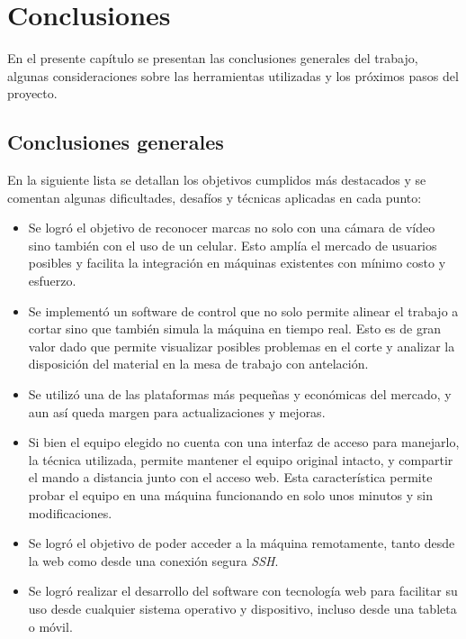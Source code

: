 \chapter{Conclusiones}
\label{Chapter5}
En el presente capítulo se presentan las conclusiones generales del trabajo, algunas consideraciones sobre las herramientas utilizadas y los próximos pasos del proyecto.

\section{Conclusiones generales }

En la siguiente lista se detallan los objetivos cumplidos más destacados y se comentan algunas dificultades, desafíos y técnicas aplicadas en cada punto:

\begin{itemize}
   \item{Se logró el objetivo de reconocer marcas no solo con una cámara de vídeo sino también con el uso de un celular. Esto amplía el mercado de usuarios posibles y facilita la integración en máquinas existentes con mínimo costo y esfuerzo.}

   \item{Se implementó un software de control que no solo permite alinear el trabajo a cortar sino que también simula la máquina en tiempo real. Esto es de gran valor dado que permite visualizar posibles problemas en el corte y analizar la disposición del material en la mesa de trabajo con antelación.}

   \item{Se utilizó una de las plataformas más pequeñas y económicas del mercado, y aun así queda margen para actualizaciones y mejoras.}

   \item{Si bien el equipo elegido no cuenta con una interfaz de acceso para manejarlo, la técnica utilizada, permite mantener el equipo original intacto, y compartir el mando a distancia junto con el acceso web. Esta característica permite probar el equipo en una máquina funcionando en solo unos minutos y sin modificaciones.}

   \item{Se logró el objetivo de poder acceder a la máquina remotamente, tanto desde la web como desde una conexión segura \textit{SSH}.}

   \item{Se logró realizar el desarrollo del software con tecnología web para facilitar su uso desde cualquier sistema operativo y dispositivo, incluso desde una tableta o móvil.}


\end{itemize}
